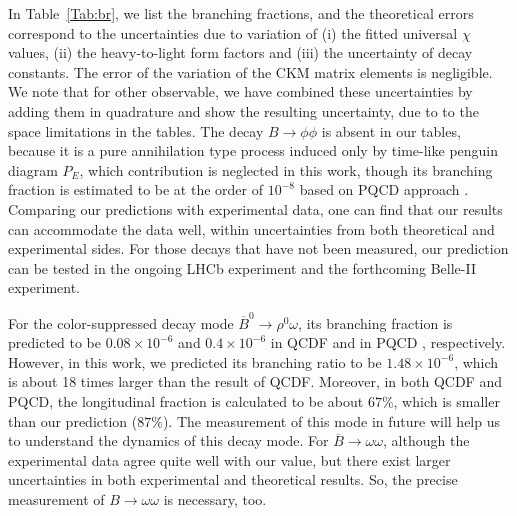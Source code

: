 \documentclass[11pt]{article}
\begin{document}
  In Table~\ref{Tab:br}, we list the branching fractions, and the theoretical errors correspond to the uncertainties due to variation of (i) the fitted universal $\chi$ values, (ii) the heavy-to-light form factors and (iii) the uncertainty of decay constants. The error of the variation of the CKM matrix elements is negligible. We note that for other observable, we have combined these uncertainties by adding them in quadrature and show the resulting uncertainty, due to to the space limitations in the tables.
 The decay $B \to \phi\phi$ is absent  in our tables, because it is a pure  annihilation type process induced only by time-like penguin diagram $P_E$, which contribution is neglected in this work, though its branching fraction is estimated to be at the order of $10^{-8}$ based on PQCD approach \cite{liying:phihi}. Comparing our predictions with experimental data, one can find that our results can accommodate the data well, within uncertainties from both theoretical and experimental sides. For those decays that have not been measured, our prediction can be tested in the ongoing LHCb experiment and the forthcoming Belle-II experiment.


For the color-suppressed decay mode $\overline B^0\to \rho^0\omega$, its branching fraction is predicted to be $0.08\times 10^{-6}$ and  $0.4\times 10^{-6}$ in QCDF \cite{Cheng:2008gxa} and in PQCD \cite{Zou:2015iwa}, respectively. However, in this work, we predicted its branching ratio to be  $1.48\times 10^{-6}$, which is about 18 times larger than the result of QCDF. Moreover, in both QCDF and PQCD, the longitudinal fraction is calculated to be about $67\%$, which is   smaller than our prediction ($87\%$). The measurement of this mode in future will help us to understand the dynamics of this decay mode. For $\overline B\to \omega\omega$, although the experimental data agree quite well with our value, but there exist larger uncertainties in both experimental and theoretical results. So, the precise measurement of $B\to \omega\omega$ is necessary, too.
\end{document}
